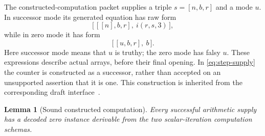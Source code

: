 \documentclass[11pt,letterpaper]{article}
\newtheorem{lemma}[theorem]{Lemma}
\theoremstyle{definition}\newtheorem{definition}[theorem]{Definition}
\theoremstyle{remark}\newtheorem{remark}[theorem]{Remark}
\begin{document}
The constructed-computation packet supplies a triple $s=[n,b,r]$ and a
mode $u$.  In successor mode its generated equation has raw form
\[
 \bigl[\,[[n],b,r],\ i(r,s,3)\,\bigr],
 \tag{Step supply}\label{eq:step-supply}
\]
while in zero mode it has form
\[
                    \bigl[\,[u,b,r],\ b\,\bigr].
 \tag{Zero supply}\label{eq:base-supply}
\]
Here successor mode means that $u$ is truthy; the zero mode has falsy
$u$.  These expressions describe actual arrays, before their final
opening.  In \eqref{eq:step-supply} the counter is constructed as a
successor, rather than accepted on an unsupported assertion that it is
one.  This construction is inherited from the corresponding draft
interface~\cite{constructed}.

\begin{lemma}[Sound constructed computation]
\label{lem:constructed-supply}
Every successful arithmetic supply has a decoded zero instance
derivable from the two scalar-iteration computation schemas.
\end{lemma}
\end{document}
